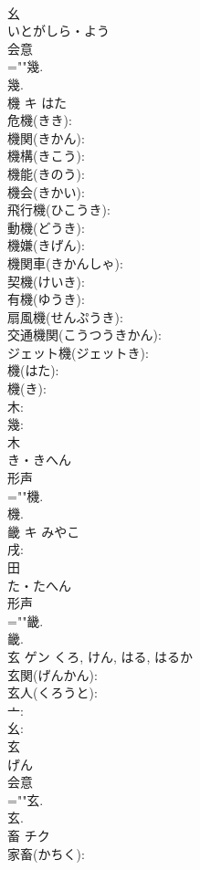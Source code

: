 \documentclass[8pt]{extreport}
\begin{document}
\begin{CJK}{UTF8}{min}
\\	幺	
\\	いとがしら・よう	
\\	会意 
\\	=""幾.
\\	幾.
\\	機	キ	はた		
\\	危機(きき): 
\\	機関(きかん): 
\\	機構(きこう): 
\\	機能(きのう): 
\\	機会(きかい): 
\\	飛行機(ひこうき): 
\\	動機(どうき): 
\\	機嫌(きげん): 
\\	機関車(きかんしゃ): 
\\	契機(けいき): 
\\	有機(ゆうき): 
\\	扇風機(せんぷうき): 
\\	交通機関(こうつうきかん): 
\\	ジェット機(ジェットき): 
\\	機(はた): 
\\	機(き): 
\\	木: 
\\	幾: 
\\	木	
\\	き・きへん	
\\	形声 
\\	=""機.
\\	機.
\\	畿	キ	みやこ		
\\	戌: 
\\	田	
\\	た・たへん	
\\	形声 
\\	=""畿.
\\	畿.
\\	玄	ゲン		くろ, けん, はる, はるか	
\\	玄関(げんかん): 
\\	玄人(くろうと): 
\\	亠: 
\\	幺: 
\\	玄	
\\	げん	
\\	会意 
\\	=""玄.
\\	玄.
\\	畜	チク			
\\	家畜(かちく): 

\end{CJK}
\end{document}
